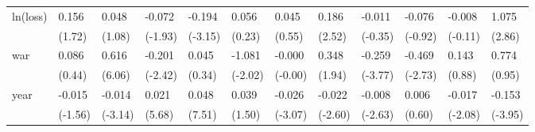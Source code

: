 \begin{tabular}{p{1.5cm} p{2cm} p{1.7cm} p{1.7cm} p{1.7cm} p{1.7cm} p{1.7cm} p{1.7cm} p{1.7cm} p{1.7cm} p{1.7cm} p{1.7cm}}
\hline
ln(loss)        &    0.156         &    0.048         &   -0.072         &   -0.194\sym{*}  &    0.056         &    0.045         &    0.186\sym{*}  &   -0.011         &   -0.076         &   -0.008         &    1.075\sym{*}  \\
                &   (1.72)         &   (1.08)         &  (-1.93)         &  (-3.15)         &   (0.23)         &   (0.55)         &   (2.52)         &  (-0.35)         &  (-0.92)         &  (-0.11)         &   (2.86)         \\
war             &    0.086         &    0.616\sym{***}&   -0.201\sym{*}  &    0.045         &   -1.081         &   -0.000         &    0.348         &   -0.259\sym{***}&   -0.469\sym{*}  &    0.143         &    0.774         \\
                &   (0.44)         &   (6.06)         &  (-2.42)         &   (0.34)         &  (-2.02)         &  (-0.00)         &   (1.94)         &  (-3.77)         &  (-2.73)         &   (0.88)         &   (0.95)         \\
year            &   -0.015         &   -0.014\sym{**} &    0.021\sym{***}&    0.048\sym{***}&    0.039         &   -0.026\sym{*}  &   -0.022\sym{*}  &   -0.008\sym{*}  &    0.006         &   -0.017\sym{*}  &   -0.153\sym{**} \\
                &  (-1.56)         &  (-3.14)         &   (5.68)         &   (7.51)         &   (1.50)         &  (-3.07)         &  (-2.60)         &  (-2.63)         &   (0.60)         &  (-2.08)         &  (-3.95)         \\
\end{tabular}
\def\sym#1{\ifmmode^{#1}\else\(^{#1}\)\fi}
